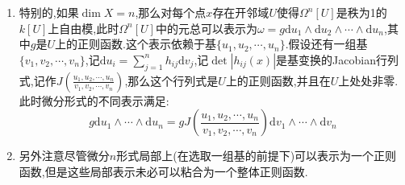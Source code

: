 \begin{enumerate}
\begin{proof}
		最后说明这个和是直和,即如果$\sum g_{i_1,i_2,\cdots,i_r}\mathrm{d}u_{i_1}\wedge\mathrm{d}u_{i_2}\wedge\cdots\wedge\mathrm{d}u_{i_r}=0$,那么有$\sum g_{i_1,i_2,\cdots,i_r}(x)\mathrm{d}_xu_{i_1}\wedge\mathrm{d}_xu_{i_2}\wedge\cdots\wedge\mathrm{d}_xu_{i_r}=0$对任意$x\in U$成立.但是$\{\mathrm{d}_xu_i\}$是$T_{X,x}^*$的一组基,于是$\{\mathrm{d}_xu_{i_1}\wedge\mathrm{d}_xu_{i_2}\wedge\cdots\wedge\mathrm{d}_xu_{i_r}\}$是$\bigwedge^rT_{X,x}^*$的一组基,这说明全体$g_{i_1,i_2,\cdots,i_r}=0$,这说明和是直和.
	\end{proof}
    \item 特别的,如果$\dim X=n$,那么对每个点$x$存在开邻域$U$使得$\Omega^n[U]$是秩为1的$k[U]$上自由模,此时$\Omega^n[U]$中的元总可以表示为$\omega=g\mathrm{d}u_1\wedge\mathrm{d}u_2\wedge\cdots\wedge\mathrm{d}u_n$,其中$g$是$U$上的正则函数.这个表示依赖于基$\{u_1,u_2,\cdots,u_n\}$.假设还有一组基$\{v_1,v_2,\cdots,v_n\}$,记$\mathrm{d}u_i=\sum_{j=1}^nh_{ij}\mathrm{d}v_j$,记$\det|h_{ij}(x)|$是基变换的Jacobian行列式,记作$J(\frac{u_1,u_2,\cdots,u_n}{v_1,v_2,\cdots,v_n})$,那么这个行列式是$U$上的正则函数,并且在$U$上处处非零.此时微分形式的不同表示满足:
    $$g\mathrm{d}u_1\wedge\cdots\wedge\mathrm{d}u_n=gJ(\frac{u_1,u_2,\cdots,u_n}{v_1,v_2,\cdots,v_n})\mathrm{d}v_1\wedge\cdots\wedge\mathrm{d}v_n$$
    \item 另外注意尽管微分$n$形式局部上(在选取一组基的前提下)可以表示为一个正则函数,但是这些局部表示未必可以粘合为一个整体正则函数.
\end{enumerate}

